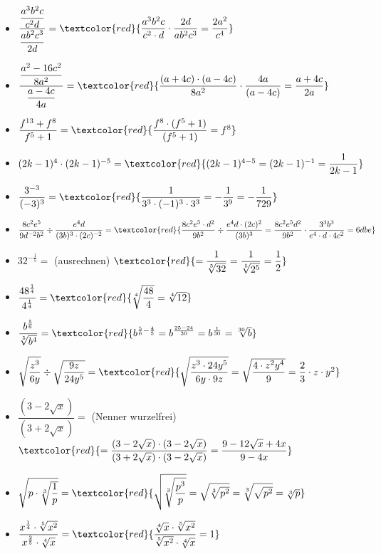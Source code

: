 \documentclass[11pt, a4paper, twoside, fleqn]{article}
\begin{document}
\begin{itemize}[itemsep=3ex , leftmargin=*]
\item $ \dfrac{\dfrac{a^{3}b^{2}c}{c^{2}d}}{\dfrac{ab^{2}c^{3}}{2d}} =
\textcolor{red}{\dfrac{a^{3}b^{2}c}{c^{2} \cdot d} \cdot \dfrac{2d}{ab^{2}c^{3}} = \dfrac{2a^{2}}{c^{4}}} $
\item $ \dfrac{\dfrac{a^{2} - 16c^{2}}{8a^{2}}}{\dfrac{a - 4c}{4a}} = \textcolor{red}{\dfrac{(a + 4c) \cdot (a - 4c)}{8a^{2}} \cdot \dfrac{4a}{(a - 4c)} = \dfrac{a + 4c}{2a}} $
\item $ \dfrac{f^{13} + f^{8}}{f^{5} + 1} = \textcolor{red}{\dfrac{f^{8}\cdot (f^{5} + 1)}{(f^{5} + 1)} = f^{8}} $
\item $ (2k - 1)^{4} \cdot (2k - 1)^{-5} = \textcolor{red}{(2k - 1)^{4 - 5} = (2k - 1)^{-1} = \dfrac{1}{2k - 1}} $
\item $ \dfrac{3^{-3}}{(-3)^{3}} = \textcolor{red}{\dfrac{1}{3^{3}\cdot (-1)^{3} \cdot 3^{3}} = - \dfrac{1}{3^{9}} = - \dfrac{1}{729}} $
\item $\dfrac{8c^{2}e^{5}}{9d^{-2}b^{2}} \div \dfrac{e^{4}d}{(3b)^{3} \cdot (2c)^{-2}} = \textcolor{red}{\dfrac{8c^{2}e^{5} \cdot d^{2}}{9b^{2}} \div \dfrac{e^{4}d \cdot (2c)^{2}}{(3b)^{3}} = \dfrac{8c^{2}e^{5}d^{2}}{9b^{2}} \cdot \dfrac{3^{3} b^{3}}{e^{4} \cdot d \cdot 4c^{2}} = 6dbe } $ 
\item $ 32^{-\frac{1}{5}} = $ (ausrechnen) $ \textcolor{red}{ = \dfrac{1}{\sqrt[5]{32}} = \dfrac{1}{\sqrt[5]{2^{5}}}= \dfrac{1}{2}} $
\item $ \dfrac{48^{\frac{1}{4}}}{4^{\frac{1}{4}}} = \textcolor{red}{\sqrt[4]{\dfrac{48}{4}} = \sqrt[4]{12}} $
\item $ \dfrac{b^{\frac{5}{6}}}{\sqrt[5]{b^{4}}} = \textcolor{red}{b^{\frac{5}{6} - \frac{4}{5}} = b^{\frac{25 - 24}{30}} = b^{\frac{1}{30}} = \sqrt[30]{b}} $
\item $ \sqrt{\dfrac{z^{3}}{6y}} \div \sqrt{\dfrac{9z}{24y^{5}}} = \textcolor{red}{\sqrt{\dfrac{z^{3} \cdot 24y^{5}}{6y \cdot 9z}} = \sqrt{\dfrac{4 \cdot z^{2}y^{4}}{9}} = \dfrac{2}{3} \cdot z \cdot y^{2}} $
\item $ \dfrac{(3 - 2\sqrt{x})}{(3 + 2\sqrt{x})} = $ (Nenner wurzelfrei) $ \textcolor{red}{= \dfrac{(3 - 2\sqrt{x}) \cdot (3 - 2\sqrt{x})}{(3 + 2\sqrt{x}) \cdot(3 - 2\sqrt{x})} = \dfrac{9 - 12\sqrt{x} + 4x}{9 - 4x}} $
\item $ \sqrt{p \cdot \sqrt[3]{\dfrac{1}{p}}} = \textcolor{red}{\sqrt{\sqrt[3]{\dfrac{p^{3}}{p}}} = \sqrt{\sqrt[3]{p^{2}}} = \sqrt[3]{\sqrt{p^{2}}} = \sqrt[3]{p}} $
\item $ \dfrac{x^{\frac{1}{4}} \cdot \sqrt[5]{x^{2}}}{x^{\frac{2}{5}} \cdot \sqrt[4]{x}} = \textcolor{red}{\dfrac{\sqrt[4]{x} \cdot \sqrt[5]{x^{2}}}{\sqrt[5]{x^{2}} \cdot \sqrt[4]{x}} = 1} $
\end{itemize}
\end{document}
